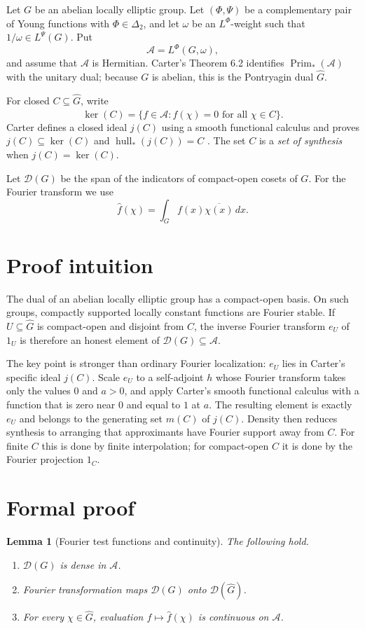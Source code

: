 \documentclass[11pt]{article}
\newtheorem{lemma}[theorem]{Lemma}
\newcommand{\A}{\mathcal A}
\newcommand{\D}{\mathcal D}
\newcommand{\wideG}{\widehat G}
\begin{document}
Let $G$ be an abelian locally elliptic group.  Let $(\Phi,\Psi)$ be a
complementary pair of Young functions with $\Phi\in\Delta_2$, and let $\omega$
be an $L^\Phi$-weight such that $1/\omega\in L^\Psi(G)$.  Put
\[
   \A=L^\Phi(G,\omega),
\]
and assume that $\A$ is Hermitian.  Carter's Theorem 6.2 identifies
$\operatorname{Prim}_*(\A)$ with the unitary dual; because $G$ is abelian,
this is the Pontryagin dual $\wideG$.

For closed $C\subseteq\wideG$, write
\[
 \ker(C)=\{f\in\A:\widehat f(\chi)=0\text{ for all }\chi\in C\}.
\]
Carter defines a closed ideal $j(C)$ using a smooth functional calculus and
proves $j(C)\subseteq\ker(C)$ and
$\operatorname{hull}_*(j(C))=C$ \cite[Theorem 7.1]{Carter}.  The set $C$ is a
\emph{set of synthesis} when $j(C)=\ker(C)$.

Let $\D(G)$ be the span of the indicators of compact-open cosets of $G$.
For the Fourier transform we use
\[
 \widehat f(\chi)=\int_G f(x)\overline{\chi(x)}\,dx.
\]

\section{Proof intuition}

The dual of an abelian locally elliptic group has a compact-open basis.  On
such groups, compactly supported locally constant functions are Fourier
stable.  If $U\subseteq\wideG$ is compact-open and disjoint from $C$, the
inverse Fourier transform $e_U$ of $1_U$ is therefore an honest element of
$\D(G)\subseteq\A$.

The key point is stronger than ordinary Fourier localization: $e_U$ lies in
Carter's specific ideal $j(C)$.  Scale $e_U$ to a self-adjoint $h$ whose
Fourier transform takes only the values $0$ and $a>0$, and apply Carter's
smooth functional calculus with a function that is zero near $0$ and equal to
$1$ at $a$.  The resulting element is exactly $e_U$ and belongs to the
generating set $m(C)$ of $j(C)$.  Density then reduces synthesis to arranging
that approximants have Fourier support away from $C$.  For finite $C$ this is
done by finite interpolation; for compact-open $C$ it is done by the Fourier
projection $1_C$.

\section{Formal proof}

\begin{lemma}[Fourier test functions and continuity]\label{lem:test}
The following hold.
\begin{enumerate}[label=\textup{(\roman*)}]
\item $\D(G)$ is dense in $\A$.
\item Fourier transformation maps $\D(G)$ onto $\D(\wideG)$.
\item For every $\chi\in\wideG$, evaluation
$f\mapsto\widehat f(\chi)$ is continuous on $\A$.
\end{enumerate}
\end{lemma}
\end{document}
